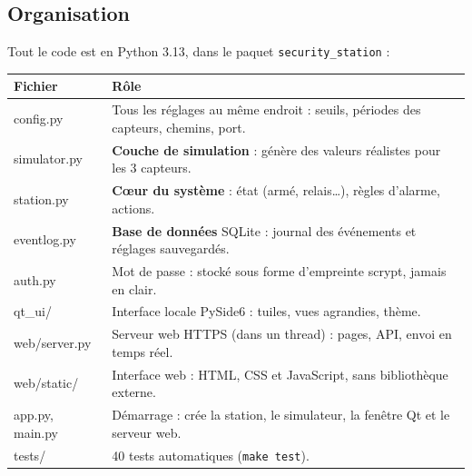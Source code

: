 \documentclass[11pt,a4paper]{article}
\begin{document}
\subsection{Organisation}
Tout le code est en Python 3.13, dans le paquet \texttt{security\_station} :

\begin{table}[H]
\centering\small
\begin{tabularx}{\linewidth}{>{\ttfamily}l X}
\toprule
\textrm{\textbf{Fichier}} & \textbf{Rôle} \\
\midrule
config.py          & Tous les réglages au même endroit : seuils, périodes des capteurs, chemins, port. \\
simulator.py       & \textbf{Couche de simulation} : génère des valeurs réalistes pour les 3 capteurs. \\
station.py         & \textbf{Cœur du système} : état (armé, relais…), règles d'alarme, actions. \\
eventlog.py        & \textbf{Base de données} SQLite : journal des événements et réglages sauvegardés. \\
auth.py            & Mot de passe : stocké sous forme d'empreinte scrypt, jamais en clair. \\
qt\_ui/            & Interface locale PySide6 : tuiles, vues agrandies, thème. \\
web/server.py      & Serveur web HTTPS (dans un thread) : pages, API, envoi en temps réel. \\
web/static/        & Interface web : HTML, CSS et JavaScript, sans bibliothèque externe. \\
app.py, main.py    & Démarrage : crée la station, le simulateur, la fenêtre Qt et le serveur web. \\
tests/             & 40 tests automatiques (\texttt{make test}). \\
\bottomrule
\end{tabularx}
\end{table}
\end{document}
